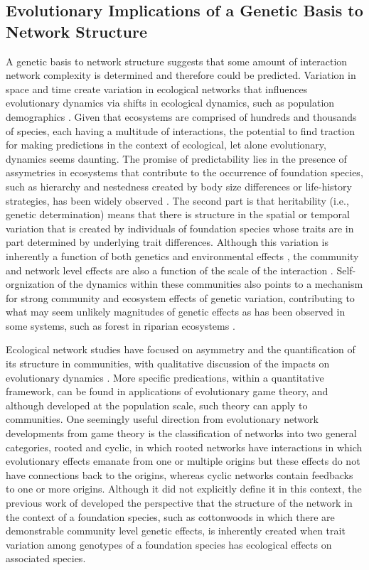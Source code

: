 \documentclass[11pt,twocolumn,twoside,lineno]{pnas-new}
\begin{document}
\subsection*{Evolutionary Implications of a Genetic Basis to Network Structure}

A genetic basis to network structure suggests that some amount
of interaction network complexity is determined and therefore could be
predicted. Variation in space and time create variation in ecological
networks that influences evolutionary dynamics via shifts in
ecological dynamics, such as population demographics
\cite{Guimaraes2020}. Given that ecosystems are comprised of hundreds
and thousands of species, each having a multitude of interactions, the
potential to find traction for making predictions in the context of
ecological, let alone evolutionary, dynamics seems daunting. The
promise of predictability lies in the presence of assymetries in
ecosystems that contribute to the occurrence of foundation species,
such as hierarchy and nestedness created by body size differences or
life-history strategies, has been widely observed
\cite{Ellison2005}. The second part is that heritability (i.e.,
genetic determination) means that there is structure in the spatial or
temporal variation that is created by individuals of foundation
species whose traits are in part determined by underlying trait
differences. Although this variation is inherently a function of both
genetics and environmental effects \cite{Conner2004ATextbook}, the
community and network level effects are also a function of the scale
of the interaction
\cite{Shuster2006COMMUNITYSTRUCTURE}. Self-orgnization of the dynamics
within these communities also points to a mechanism for strong
community and ecosystem effects of genetic variation, contributing to
what may seem unlikely magnitudes of genetic effects as has been
observed in some systems, such as forest in riparian ecosystems
\cite{Bangert2006}.

Ecological network studies have focused on asymmetry and the
quantification of its structure in communities, with qualitative
discussion of the impacts on evolutionary dynamics
\cite{Bascompte2006, Diaz-Castelazo2010, Guimaraes2011,
  Thompson2013}. More specific predications, within a quantitative
framework, can be found in applications of evolutionary game theory,
and although developed at the population scale, such theory can apply
to communities. One seemingly useful direction from evolutionary
network developments from game theory is the classification of
networks into two general categories, rooted and cyclic, in which
rooted networks have interactions in which evolutionary effects
emanate from one or multiple origins but these effects do not have
connections back to the origins, whereas cyclic networks contain
feedbacks to one or more origins. Although it did not explicitly
define it in this context, the previous work of \citep{Lau2017a}
developed the perspective that the structure of the network in the
context of a foundation species, such as cottonwoods in which there
are demonstrable community level genetic effects, is inherently
created when trait variation among genotypes of a foundation species
has ecological effects on associated species.
\end{document}

